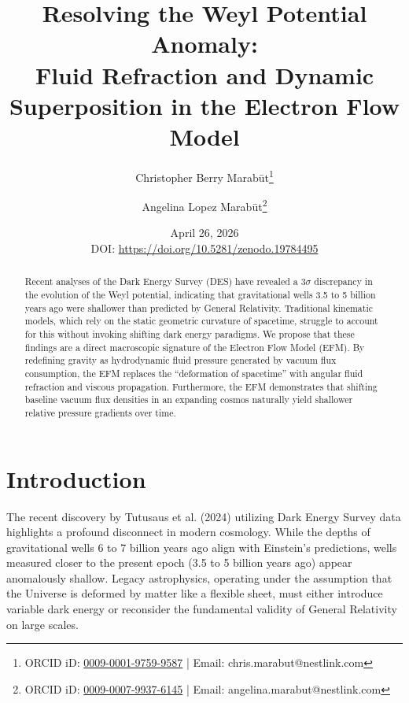 \documentclass[11pt, a4paper]{article}
\title{\textbf{Resolving the Weyl Potential Anomaly: \\ Fluid Refraction and Dynamic Superposition in the Electron Flow Model}}
\author[1]{Christopher Berry Marab\={u}t\thanks{ORCID iD: \href{https://orcid.org/0009-0001-9759-9587}{0009-0001-9759-9587} | Email: chris.marabut@nestlink.com}}
\author[1]{Angelina Lopez Marab\={u}t\thanks{ORCID iD: \href{https://orcid.org/0009-0007-9937-6145}{0009-0007-9937-6145} | Email: angelina.marabut@nestlink.com}}
\affil[1]{Independent Researchers}
\date{April 26, 2026 \\ \small{DOI: \url{https://doi.org/10.5281/zenodo.19784495}}}
\begin{document}

\maketitle

\begin{abstract}
Recent analyses of the Dark Energy Survey (DES) have revealed a $3\sigma$ discrepancy in the evolution of the Weyl potential, indicating that gravitational wells 3.5 to 5 billion years ago were shallower than predicted by General Relativity. Traditional kinematic models, which rely on the static geometric curvature of spacetime, struggle to account for this without invoking shifting dark energy paradigms. We propose that these findings are a direct macroscopic signature of the Electron Flow Model (EFM). By redefining gravity as hydrodynamic fluid pressure generated by vacuum flux consumption, the EFM replaces the ``deformation of spacetime'' with angular fluid refraction and viscous propagation. Furthermore, the EFM demonstrates that shifting baseline vacuum flux densities in an expanding cosmos naturally yield shallower relative pressure gradients over time.
\end{abstract}

\section{Introduction}
The recent discovery by Tutusaus et al. (2024) \cite{tutusaus2024} utilizing Dark Energy Survey data highlights a profound disconnect in modern cosmology. While the depths of gravitational wells 6 to 7 billion years ago align with Einstein's predictions, wells measured closer to the present epoch (3.5 to 5 billion years ago) appear anomalously shallow. Legacy astrophysics, operating under the assumption that the Universe is deformed by matter like a flexible sheet, must either introduce variable dark energy or reconsider the fundamental validity of General Relativity on large scales. 
\end{document}
